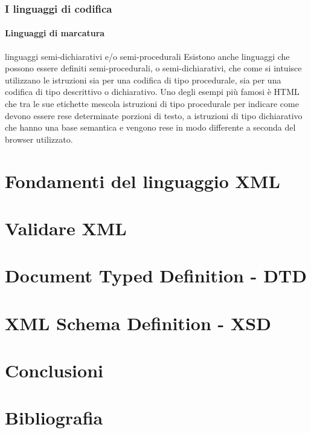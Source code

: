 \documentclass{beamer}
\begin{document}
\begin{frame}
	\frametitle{I linguaggi di codifica}
	\framesubtitle{Linguaggi di marcatura}
	\addtocounter{nframe}{1}

	\begin{block}{linguaggi semi-dichiarativi e/o semi-procedurali}
		Esistono anche linguaggi che possono essere definiti
		semi-procedurali, o semi-dichiarativi, che come si intuisce utilizzano le istruzioni sia
		per una codifica di tipo procedurale, sia per una codifica di tipo descrittivo o
		dichiarativo. Uno degli esempi più famosi è HTML che tra le sue etichette mescola
		istruzioni di tipo procedurale per indicare come devono essere rese determinate
		porzioni di testo, a istruzioni di tipo dichiarativo che hanno una base semantica e
		vengono rese in modo differente a seconda del browser utilizzato.
	\end{block}

\end{frame}


\section{Fondamenti del linguaggio XML}
%

\section{Validare XML }
%

\section{Document Typed Definition - DTD}
%

%

\section{XML Schema Definition - XSD}
%
%

\section{Conclusioni}
%

\section*{Bibliografia}
%
\end{document}
